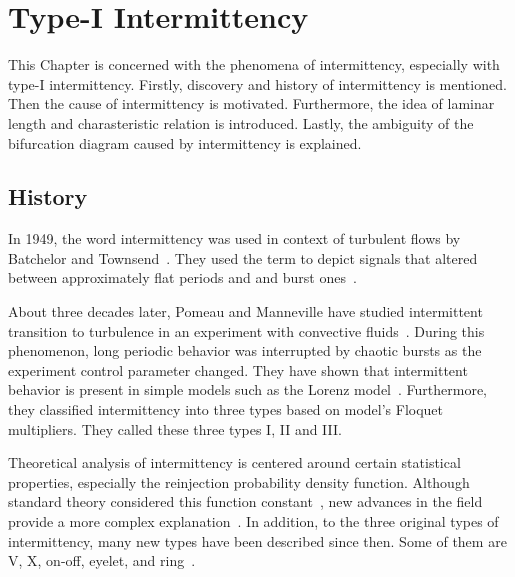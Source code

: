 \chapter{Type-I Intermittency}
\label{chap:type-I intermittency}

This Chapter is concerned with the phenomena of intermittency, especially with type-I intermittency.
Firstly, discovery and history of intermittency is mentioned.
Then the cause of intermittency is motivated.
Furthermore, the idea of laminar length and charasteristic relation is introduced.
Lastly, the ambiguity of the bifurcation diagram caused by intermittency is explained.

\section{History}
In 1949, the word intermittency was used in context of turbulent flows by Batchelor and Townsend~\cite{Batchelor19491025}.
They used the term to depict signals that altered between approximately flat periods and and burst ones~\cite{Elaskar2017}.
\par
About three decades later, Pomeau and Manneville have studied intermittent transition to turbulence in an experiment with convective fluids~\cite{Pomeau1980}.
During this phenomenon, long periodic behavior was interrupted by chaotic bursts as the experiment control parameter changed.
They have shown that intermittent behavior is present in simple models such as the Lorenz model~\cite{Lorenz2004}.
Furthermore, they classified intermittency into three types based on model's Floquet multipliers.
They called these three types I, II and III.
\par
Theoretical analysis of intermittency is centered around certain statistical properties, especially the reinjection probability density function.
Although standard theory considered this function constant~\cite{Dubois1983}, new advances in the field provide a more complex explanation~\cite{Elaskar2022}.
In addition, to the three original types of intermittency, many new types have been described since then.
Some of them are V, X, on-off, eyelet, and ring~\cite{Elaskar2022}.

